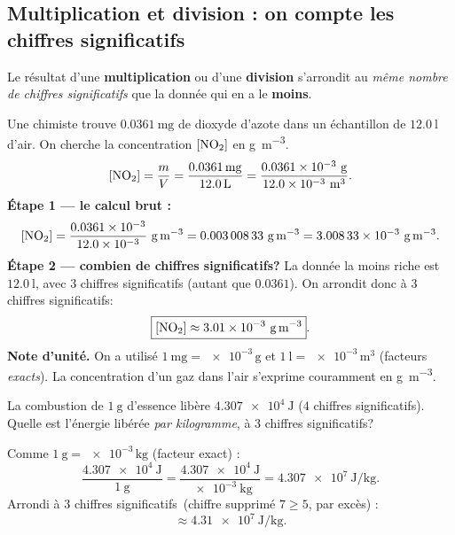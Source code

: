 \documentclass[11pt,a4paper]{article}
\newcommand{\CS}{chiffres significatifs}
\begin{document}
\subsection{Multiplication et division : on compte les \CS}
\label{sec:opmult}

\begin{regle}
Le résultat d'une \textbf{multiplication} ou d'une \textbf{division} s'arrondit au \emph{même nombre de
\CS} que la donnée qui en a le \textbf{moins}.
\end{regle}

\begin{exemple}
Une chimiste trouve $\qty{0,0361}{\milli\gram}$ de dioxyde d'azote  dans un échantillon de
$\qty{12,0}{\litre}$ d'air. On cherche la concentration $[\ce{NO2}]$ en \si{\gram\per\cubic\metre}.
\[ [\ce{NO2}]=\frac{m}{V}=\frac{\qty{0,0361}{\milli\gram}}{\qty{12,0}{\litre}}
   =\frac{\num{0,0361e-3}\ \si{\gram}}{\num{12,0e-3}\ \si{\cubic\metre}}. \]
\textbf{Étape 1 — le calcul brut :}
\[ [\ce{NO2}]=\frac{\num{0,0361e-3}}{\num{12,0e-3}}\ \si{\gram\per\cubic\metre}
   =\num{0,00300833}\ \si{\gram\per\cubic\metre}=\num{3,00833e-3}\ \si{\gram\per\cubic\metre}. \]
\textbf{Étape 2 — combien de \CS ?} La donnée la moins riche est $\qty{12,0}{\litre}$, avec $3$ \CS
(autant que $\num{0,0361}$). On arrondit donc à $3$ \CS :
\[ \boxed{[\ce{NO2}]\approx\num{3,01e-3}\ \si{\gram\per\cubic\metre}}. \]
\textbf{Note d'unité.} On a utilisé $\qty{1}{\milli\gram}=\num{e-3}\,\si{\gram}$ et
$\qty{1}{\litre}=\num{e-3}\,\si{\cubic\metre}$ (facteurs \emph{exacts}). La concentration d'un gaz
dans l'air s'exprime couramment en \si{\gram\per\cubic\metre}.
\end{exemple}

\begin{exemple}
La combustion de $\qty{1}{\gram}$ d'essence libère $\num{4,307e4}\ \si{\joule}$ ($4$ \CS). Quelle est
l'énergie libérée \emph{par kilogramme}, à $3$ \CS ?

Comme $\qty{1}{\gram}=\num{e-3}\,\si{\kilo\gram}$ (facteur exact) :
\[ \frac{\num{4,307e4}\ \si{\joule}}{\qty{1}{\gram}}
   =\frac{\num{4,307e4}\ \si{\joule}}{\num{e-3}\ \si{\kilo\gram}}
   =\num{4,307e7}\ \si{\joule\per\kilo\gram}. \]
Arrondi à $3$ \CS\ (chiffre supprimé $7\ge5$, par excès) :
\[ \boxed{\approx\num{4,31e7}\ \si{\joule\per\kilo\gram}}. \]
\end{exemple}
\end{document}
